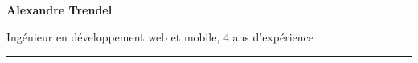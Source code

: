 \documentclass{cv}
\begin{document}
\pagestyle{empty}

\noindent\begin{minipage}[c]{.65\textwidth}
	\large
	\textbf{Alexandre Trendel}

	Ingénieur en développement web et mobile, 4 ans d'expérience

	\color{solred}\rule{2cm}{1pt}

\end{minipage}%
\hfill
\begin{minipage}[c]{0.28\textwidth}%

	\centering

\end{minipage}	

\vspace{1cm}
\end{document}
